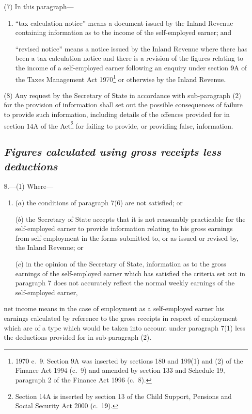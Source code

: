 \documentclass[12pt,a4paper]{article}
\begin{document}
(7) In this paragraph—
\begin{enumerate}\item[]
“tax calculation notice” means a document issued by the Inland Revenue containing information as to the income of the self-employed earner; and

“revised notice” means a notice issued by the Inland Revenue where there has been a tax calculation notice and there is a revision of the figures relating to the income of a self-employed earner following an enquiry under section 9A of the Taxes Management Act 1970\footnote{1970 c.\ 9. Section 9A was inserted by sections 180 and 199(1) and (2) of the Finance Act 1994 (c.\ 9) and amended by section 133 and Schedule 19, paragraph 2 of the Finance Act 1996 (c.\ 8).} or otherwise by the Inland Revenue.
\end{enumerate}

(8) Any request by the Secretary of State in accordance with sub-paragraph (2) for the provision of information shall set out the possible consequences of failure to provide such information, including details of the offences provided for in section 14A of the Act\footnote{Section 14A is inserted by section 13 of the Child Support, Pensions and Social Security Act 2000 (c.\ 19).} for failing to provide, or providing false, information.

\subsection*{\itshape Figures calculated using gross receipts less deductions}

8.---(1)  Where—
\begin{enumerate}\item[]
($a$) the conditions of paragraph 7(6) are not satisfied; or

($b$) the Secretary of State accepts that it is not reasonably practicable for the self-employed earner to provide information relating to his gross earnings from self-employment in the forms submitted to, or as issued or revised by, the Inland Revenue; or

($c$) in the opinion of the Secretary of State, information as to the gross earnings of the self-employed earner which has satisfied the criteria set out in paragraph 7 does not accurately reflect the normal weekly earnings of the self-employed earner,
\end{enumerate}
net income means in the case of employment as a self-employed earner his earnings calculated by reference to the gross receipts 
in respect of employment which are of a type which would be taken into account under paragraph 7(1)  %
less the deductions provided for in sub-paragraph (2).
\end{document}

